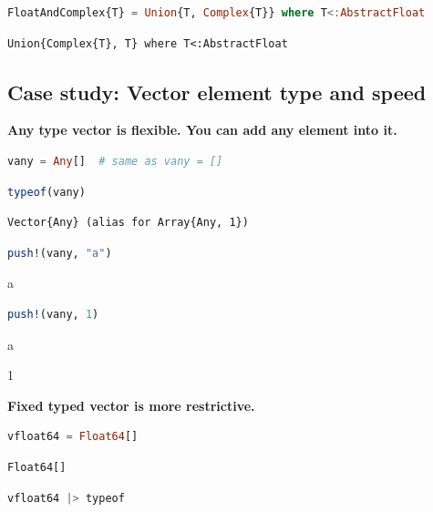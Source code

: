 \documentclass[
  notoc %
]{tufte-book}
\begin{document}
\begin{lstlisting}[language=Julia]
FloatAndComplex{T} = Union{T, Complex{T}} where T<:AbstractFloat
\end{lstlisting}

\begin{lstlisting}[language=Output]
Union{Complex{T}, T} where T<:AbstractFloat
\end{lstlisting}

\hypertarget{case-study-vector-element-type-and-speed}{%
\subsection{Case study: Vector element type and
speed}\label{case-study-vector-element-type-and-speed}}

\textbf{Any type vector is flexible. You can add any element into it.}

\begin{lstlisting}[language=Julia]
vany = Any[]  # same as vany = []
\end{lstlisting}

\begin{lstlisting}[language=Julia]
typeof(vany)
\end{lstlisting}

\begin{lstlisting}[language=Output]
Vector{Any} (alias for Array{Any, 1})
\end{lstlisting}

\begin{lstlisting}[language=Julia]
push!(vany, "a")
\end{lstlisting}

a

\begin{lstlisting}[language=Julia]
push!(vany, 1)
\end{lstlisting}

a

1

\textbf{Fixed typed vector is more restrictive.}

\begin{lstlisting}[language=Julia]
vfloat64 = Float64[]
\end{lstlisting}

\begin{lstlisting}[language=Output]
Float64[]
\end{lstlisting}

\begin{lstlisting}[language=Julia]
vfloat64 |> typeof
\end{lstlisting}
\end{document}
